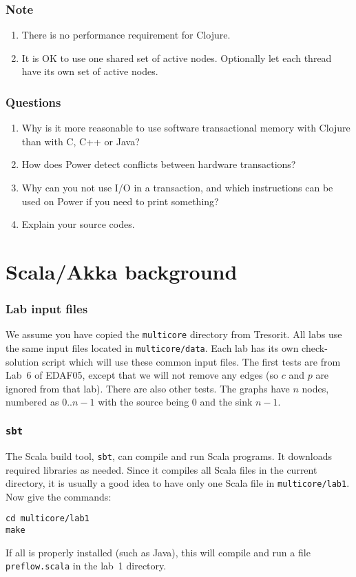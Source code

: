 \documentclass{forsete}
\begin{document}
\subsubsection*{Note}
\begin{enumerate}
\item There is no performance requirement for Clojure.
\item It is OK to use one shared set of active nodes. Optionally let each thread have
its own set of active nodes.
\end{enumerate}

\subsubsection*{Questions}
\begin{enumerate}
\item Why is it more reasonable to use software transactional memory with
Clojure than with C, C++ or Java?
\item How does Power detect conflicts between hardware transactions?
\item Why can you not use I/O in a transaction, and which instructions can be used on Power if
you need to print something?
\item Explain your source codes.
\end{enumerate}

\newpage
\section{Scala/Akka background}

\subsubsection*{Lab input files}
We assume you have copied the {\tt multicore} directory from Tresorit.
All labs use the same input files located in {\tt multicore/data}.
Each lab has its own check-solution script which will use these common
input files. The first tests are from Lab~6 of EDAF05, except that we will not
remove any edges (so $c$ and $p$ are ignored from that lab). There are also other tests.
The graphs have $n$ nodes, numbered as $0..n-1$ with the source being $0$ and
the sink $n-1$.

\subsubsection*{{\tt sbt}}
The Scala build tool, {\tt sbt}, can compile and run Scala programs. It downloads required libraries as needed.
Since it compiles all Scala files in the current directory, it is usually a good idea to have only one Scala file
in {\tt multicore/lab1}.
Now give the commands:
\begin{verbatim}
cd multicore/lab1
make
\end{verbatim}
If all is properly installed (such as Java), this will compile and run a file {\tt preflow.scala} in the
lab~1 directory.
\end{document}
